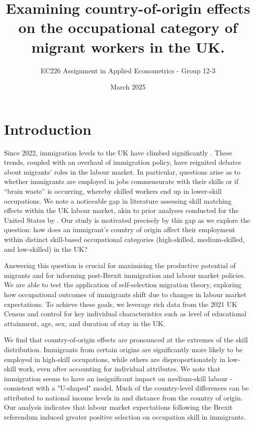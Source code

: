 \documentclass[12pt, a4paper]{article}
\title{Examining country-of-origin effects on the occupational category of migrant workers in the UK.}
\author{EC226 Assignment in Applied Econometrics - Group 12-3}
\date{March 2025}
\begin{document}


\maketitle


\section{Introduction} \label{sec:intro}




Since 2022, immigration levels to the UK have climbed significantly  \citep{ONS2023_LTIM}. These trends, coupled with an overhaul of immigration policy, have reignited debates about migrants’ roles in the labour market. In particular, questions arise as to whether immigrants are employed in jobs commensurate with their skills or if “brain waste” is occurring, whereby skilled workers end up in lower-skill occupations. We note a noticeable gap in literature assessing skill matching effects within the UK labour market, akin to prior analyses conducted for the United States by \citet{MattooBrainWaste}. Our study is motivated precisely by this gap as we explore the question: how does an immigrant’s country of origin affect their employment within distinct skill-based occupational categories (high-skilled, medium-skilled, and low-skilled) in the UK?

Answering this question is crucial for maximising the productive potential of migrants and for informing post-Brexit immigration and labour market policies. We are able to test the application of self-selection migration theory, exploring how occupational outcomes of immigrants shift due to changes in labour market expectations. To achieve these goals, we leverage rich data from the 2021 UK Census and control for key individual characteristics such as level of educational attainment, age, sex, and duration of stay in the UK. 

We find that country-of-origin effects are pronounced at the extremes of the skill distribution. Immigrants from certain origins are significantly more likely to be employed in high-skill occupations, while others are disproportionately in low-skill work, even after accounting for individual attributes. We note that immigration seems to have an insignificant impact on medium-skill labour - consistent with a "U-shaped" model. Much of the country-level differences can be attributed to national income levels in and distance from the country of origin. Our analysis indicates that labour market expectations following the Brexit referendum induced greater positive selection on occupation skill in immigrants.
\end{document}
